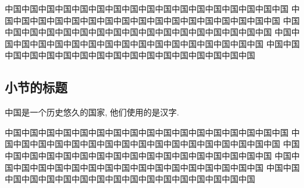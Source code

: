 中国中国中国中国中国中国中国中国中国中国中国中国中国中国中国中国中国
中国中国中国中国中国中国中国中国中国中国中国中国中国中国中国中国中国
中国中国中国中国中国中国中国中国中国中国中国中国中国中国中国中国中国
中国中国中国中国中国中国中国中国中国中国中国中国中国中国中国中国中国
中国中国中国中国中国中国中国中国中国中国中国中国中国中国中国中国中国

\subsection{小节的标题}

中国是一个历史悠久的国家, 他们使用的是汉字.

中国中国中国中国中国中国中国中国中国中国中国中国中国中国中国中国中国
中国中国中国中国中国中国中国中国中国中国中国中国中国中国中国中国中国
中国中国中国中国中国中国中国中国中国中国中国中国中国中国中国中国中国
中国中国中国中国中国中国中国中国中国中国中国中国中国中国中国中国中国
中国中国中国中国中国中国中国中国中国中国中国中国中国中国中国中国中国